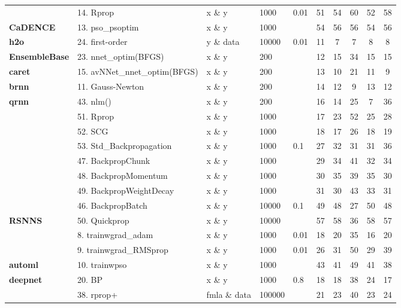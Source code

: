 \begin{Schunk}
\begin{table}[!h]
\begin{tabular}[t]{>{}lllllccccc}
 & 14. Rprop & x \& y & 1000 & 0.01 & 51 & 54 & 60 & 52 & 58\\

\multirow{-3}{*}{\raggedright\arraybackslash \textbf{CaDENCE}} & 13. pso\_psoptim & x \& y & 1000 &  & 54 & 56 & 56 & 54 & 56\\
\cmidrule{1-10}
\textbf{h2o} & 24. first-order & y \& data & 10000 & 0.01 & 11 & 7 & 7 & 8 & 8\\
\cmidrule{1-10}
\textbf{EnsembleBase} & 23. nnet\_optim(BFGS) & x \& y & 200 &  & 12 & 15 & 34 & 15 & 15\\
\cmidrule{1-10}
\textbf{caret} & 15. avNNet\_nnet\_optim(BFGS) & x \& y & 200 &  & 13 & 10 & 21 & 11 & 9\\
\cmidrule{1-10}
\textbf{brnn} & 11. Gauss-Newton & x \& y & 200 &  & 14 & 12 & 9 & 13 & 12\\
\cmidrule{1-10}
\textbf{qrnn} & 43. nlm() & x \& y & 200 &  & 16 & 14 & 25 & 7 & 36\\
\cmidrule{1-10}
 & 51. Rprop & x \& y & 1000 &  & 17 & 23 & 52 & 25 & 28\\

 & 52. SCG & x \& y & 1000 &  & 18 & 17 & 26 & 18 & 19\\

 & 53. Std\_Backpropagation & x \& y & 1000 & 0.1 & 27 & 32 & 31 & 31 & 36\\

 & 47. BackpropChunk & x \& y & 1000 &  & 29 & 34 & 41 & 32 & 34\\

 & 48. BackpropMomentum & x \& y & 1000 &  & 30 & 35 & 39 & 35 & 30\\

 & 49. BackpropWeightDecay & x \& y & 1000 &  & 31 & 30 & 43 & 33 & 31\\

 & 46. BackpropBatch & x \& y & 10000 & 0.1 & 49 & 48 & 27 & 50 & 48\\

\multirow{-8}{*}{\raggedright\arraybackslash \textbf{RSNNS}} & 50. Quickprop & x \& y & 10000 &  & 57 & 58 & 36 & 58 & 57\\
\cmidrule{1-10}
 & 8. trainwgrad\_adam & x \& y & 1000 & 0.01 & 18 & 20 & 35 & 16 & 20\\

 & 9. trainwgrad\_RMSprop & x \& y & 1000 & 0.01 & 26 & 31 & 50 & 29 & 39\\

\multirow{-3}{*}{\raggedright\arraybackslash \textbf{automl}} & 10. trainwpso & x \& y & 1000 &  & 43 & 41 & 49 & 41 & 38\\
\cmidrule{1-10}
\textbf{deepnet} & 20. BP & x \& y & 1000 & 0.8 & 18 & 18 & 38 & 24 & 17\\
\cmidrule{1-10}
 & 38. rprop+ & fmla \& data & 100000 &  & 21 & 23 & 40 & 23 & 24\\


\end{tabular}
\end{table}
\end{Schunk}
